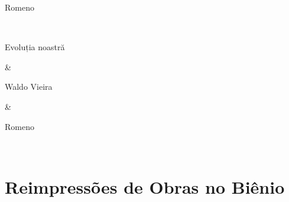 \documentclass{gescons}
\begin{document}
\begin{longtable}[]
\begin{minipage}[b]{\linewidth}
Romeno
\end{minipage} \\
\hline
\begin{minipage}[b]{\linewidth}\raggedright
Evoluția noastră
\end{minipage} & \begin{minipage}[b]{\linewidth}\raggedright
Waldo Vieira
\end{minipage} & \begin{minipage}[b]{\linewidth}\centering
Romeno
\end{minipage} \\
\midrule\noalign{}
\endhead
\bottomrule\noalign{}
\endlastfoot
\end{longtable}

\clearpage
{}
\section*{Reimpressões de Obras no Biênio}
\end{document}
